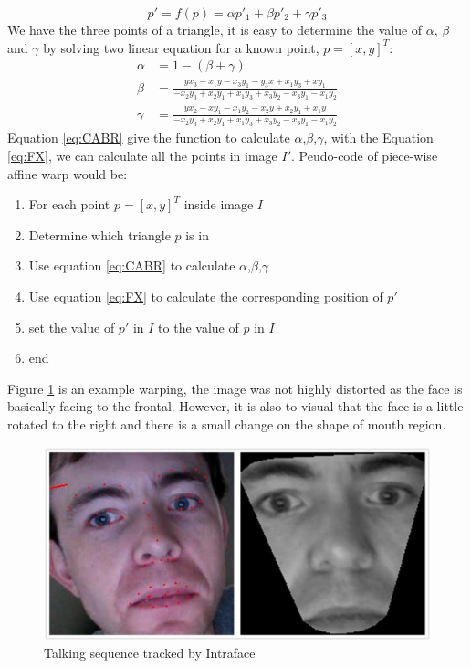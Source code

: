 \begin{equation}
p' = f(p) = \alpha p'_{1} + \beta p'_{2} + \gamma p'_{3}
\label{eq:FX}
\end{equation}
We have the three points of a triangle, it is easy to determine the value of $\alpha$, $\beta$ and $\gamma$ by solving two linear equation for a known point, $p = [x, y]^{T}$:
\begin{equation}
\label{eq:CABR}
\begin{split}
\alpha & = 1 - (\beta + \gamma) \\
\beta  & = \frac{yx_{3}-x_{1}y-x_{3}y_{1}-y_{3}x+x_{1}y_{3}+xy_{1}}{-x_{2}y_{3}+x_{2}y_{1}+x_{1}y_{3}+x_{3}y_{2}-x_{3}y_{1}-x_{1}y_{2}} \\
\gamma & = \frac{yx_{2}-xy_{1}-x_{1}y_{2}-x_{2}y+x_{2}y_{1}+x_{1}y}{-x_{2}y_{3}+x_{2}y_{1}+x_{1}y_{3}+x_{3}y_{2}-x_{3}y_{1}-x_{1}y_{2}}
\end{split}
\end{equation}
\newline
Equation \ref{eq:CABR} give the function to calculate $\alpha$,$\beta$,$\gamma$, with the Equation \ref{eq:FX}, we can calculate all the points in image $I'$. Peudo-code of piece-wise affine warp would be:
\begin{enumerate}
\item For each point $p = [x,y]^{T}$ inside image $I$
\item Determine which triangle $p$ is in
\item Use equation \ref{eq:CABR} to calculate $\alpha$,$\beta$,$\gamma$
\item Use equation \ref{eq:FX} to calculate the corresponding position of $p'$
\item set the value of $p'$ in $I$ to the value of $p$ in $I$
\item end
\end{enumerate}
Figure \ref{fig:warp} is an example warping, the image was not highly distorted as the face is basically facing to the frontal. However, it is also to visual that the face is a little rotated to the right and there is a small change on the shape of mouth region.
\begin{figure}[ht]
\centering
\includegraphics[width=.5\textwidth]{imgs/Warping_Intraface_213.png}
\caption{Talking sequence tracked by Intraface}
\label{fig:warp}
\end{figure}

